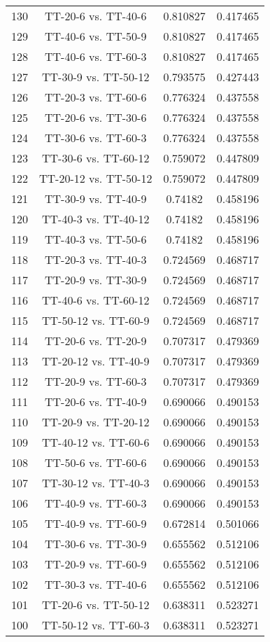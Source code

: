 \documentclass[a4paper,10pt]{article}
\begin{document}
\begin{landscape}
\begin{table}[!htp]
\begin{tabular}{cccc}
130&TT-20-6 vs. TT-40-6&0.810827&0.417465\\
129&TT-40-6 vs. TT-50-9&0.810827&0.417465\\
128&TT-40-6 vs. TT-60-3&0.810827&0.417465\\
127&TT-30-9 vs. TT-50-12&0.793575&0.427443\\
126&TT-20-3 vs. TT-60-6&0.776324&0.437558\\
125&TT-20-6 vs. TT-30-6&0.776324&0.437558\\
124&TT-30-6 vs. TT-60-3&0.776324&0.437558\\
123&TT-30-6 vs. TT-60-12&0.759072&0.447809\\
122&TT-20-12 vs. TT-50-12&0.759072&0.447809\\
121&TT-30-9 vs. TT-40-9&0.74182&0.458196\\
120&TT-40-3 vs. TT-40-12&0.74182&0.458196\\
119&TT-40-3 vs. TT-50-6&0.74182&0.458196\\
118&TT-20-3 vs. TT-40-3&0.724569&0.468717\\
117&TT-20-9 vs. TT-30-9&0.724569&0.468717\\
116&TT-40-6 vs. TT-60-12&0.724569&0.468717\\
115&TT-50-12 vs. TT-60-9&0.724569&0.468717\\
114&TT-20-6 vs. TT-20-9&0.707317&0.479369\\
113&TT-20-12 vs. TT-40-9&0.707317&0.479369\\
112&TT-20-9 vs. TT-60-3&0.707317&0.479369\\
111&TT-20-6 vs. TT-40-9&0.690066&0.490153\\
110&TT-20-9 vs. TT-20-12&0.690066&0.490153\\
109&TT-40-12 vs. TT-60-6&0.690066&0.490153\\
108&TT-50-6 vs. TT-60-6&0.690066&0.490153\\
107&TT-30-12 vs. TT-40-3&0.690066&0.490153\\
106&TT-40-9 vs. TT-60-3&0.690066&0.490153\\
105&TT-40-9 vs. TT-60-9&0.672814&0.501066\\
104&TT-30-6 vs. TT-30-9&0.655562&0.512106\\
103&TT-20-9 vs. TT-60-9&0.655562&0.512106\\
102&TT-30-3 vs. TT-40-6&0.655562&0.512106\\
101&TT-20-6 vs. TT-50-12&0.638311&0.523271\\
100&TT-50-12 vs. TT-60-3&0.638311&0.523271\\

\end{tabular}
\end{table}
\end{landscape}
\end{document}
